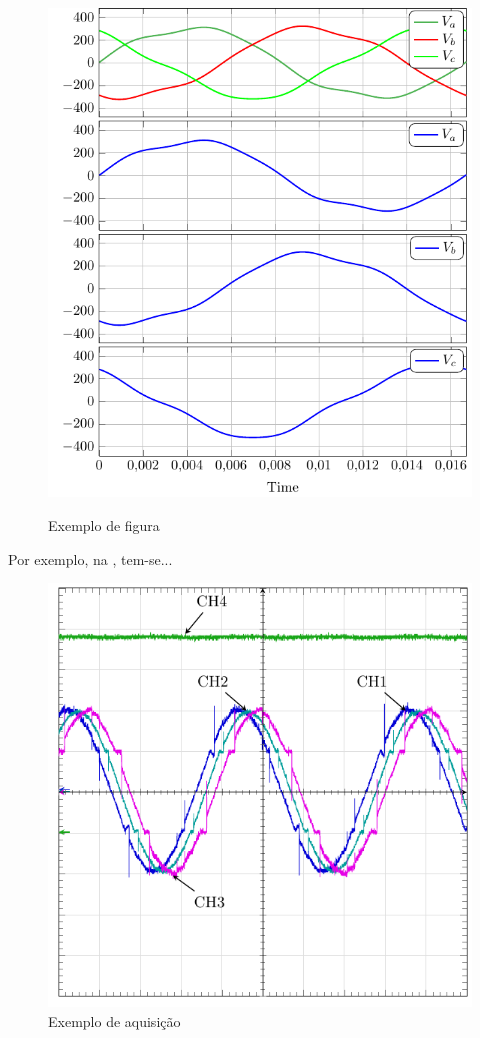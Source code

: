 \begin{figure}
    \centering
    \caption{Exemplo de figura}
    \includegraphics[width=\linewidth]{pictures/ex01}
    \label{fig:ex01}
\end{figure}

Por exemplo, na , tem-se...


\begin{figure}
    \centering
    \includegraphics[width=0.9\linewidth]{pictures/tek0009}
    \caption{Exemplo de aquisição}
    \label{fig:tek0009}
\end{figure}

